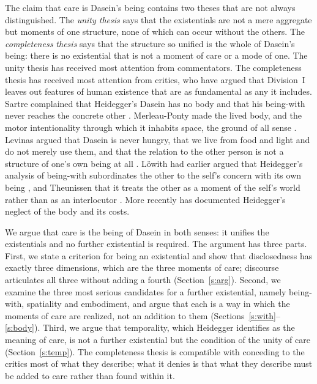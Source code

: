 \documentclass{situationist-preprint}
\begin{document}
The claim that care is Dasein's being contains two theses that are not always distinguished. The \emph{unity thesis} says that the existentials are not a mere aggregate but moments of one structure, none of which can occur without the others. The \emph{completeness thesis} says that the structure so unified is the whole of Dasein's being: there is no existential that is not a moment of care or a mode of one. The unity thesis has received most attention from commentators. The completeness thesis has received most attention from critics, who have argued that Division~I leaves out features of human existence that are as fundamental as any it includes. Sartre complained that Heidegger's Dasein has no body and that his being-with never reaches the concrete other \citep[Part~III, chs.~1--2]{Sartre1943}. Merleau-Ponty made the lived body, and the motor intentionality through which it inhabits space, the ground of all sense \citep{MerleauPonty1945}. Levinas argued that Dasein is never hungry, that we live from food and light and do not merely use them, and that the relation to the other person is not a structure of one's own being at all \citep{Levinas1961}. Löwith had earlier argued that Heidegger's analysis of being-with subordinates the other to the self's concern with its own being \citep{Lowith1928}, and Theunissen that it treats the other as a moment of the self's world rather than as an interlocutor \citep{Theunissen1965}. More recently \citet{Aho2009} has documented Heidegger's neglect of the body and its costs.

We argue that care is the being of Dasein in both senses: it unifies the existentials and no further existential is required. The argument has three parts. First, we state a criterion for being an existential and show that disclosedness has exactly three dimensions, which are the three moments of care; discourse articulates all three without adding a fourth (Section~\ref{s:arg}). Second, we examine the three most serious candidates for a further existential, namely being-with, spatiality and embodiment, and argue that each is a way in which the moments of care are realized, not an addition to them (Sections~\ref{s:with}--\ref{s:body}). Third, we argue that temporality, which Heidegger identifies as the meaning of care, is not a further existential but the condition of the unity of care (Section~\ref{s:temp}). The completeness thesis is compatible with conceding to the critics most of what they describe; what it denies is that what they describe must be added to care rather than found within it.
\end{document}

